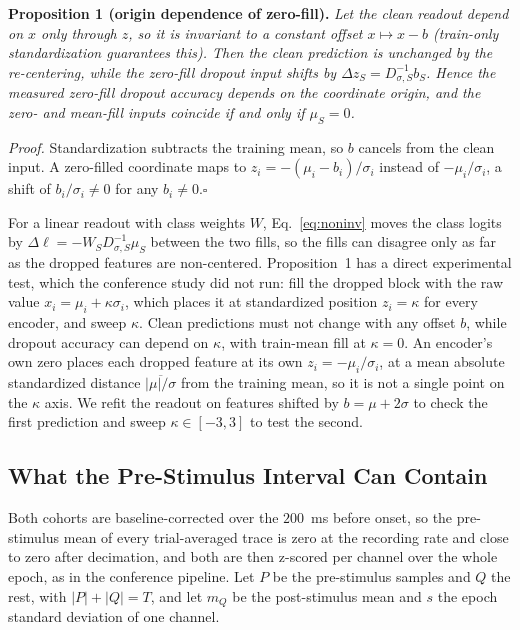 \documentclass[journal]{IEEEtran}
\begin{document}
\noindent\textbf{Proposition 1 (origin dependence of zero-fill).} \emph{Let the clean readout depend on $x$ only through $z$, so it is invariant to a constant offset $x\mapsto x-b$ (train-only standardization guarantees this). Then the clean prediction is unchanged by the re-centering, while the zero-fill dropout input shifts by $\Delta z_S=D_{\sigma,S}^{-1}b_S$. Hence the measured zero-fill dropout accuracy depends on the coordinate origin, and the zero- and mean-fill inputs coincide if and only if $\mu_S=0$.}

\noindent\emph{Proof.} Standardization subtracts the training mean, so $b$ cancels from the clean input. A zero-filled coordinate maps to $z_i=-(\mu_i-b_i)/\sigma_i$ instead of $-\mu_i/\sigma_i$, a shift of $b_i/\sigma_i\neq0$ for any $b_i\neq0$.\hfill$\square$

For a linear readout with class weights $W$, Eq.~\eqref{eq:noninv} moves the class logits by $\Delta\ell=-W_S D_{\sigma,S}^{-1}\mu_S$ between the two fills, so the fills can disagree only as far as the dropped features are non-centered. Proposition~1 has a direct experimental test, which the conference study did not run: fill the dropped block with the raw value $x_i=\mu_i+\kappa\sigma_i$, which places it at standardized position $z_i=\kappa$ for every encoder, and sweep $\kappa$. Clean predictions must not change with any offset $b$, while dropout accuracy can depend on $\kappa$, with train-mean fill at $\kappa=0$. An encoder's own zero places each dropped feature at its own $z_i=-\mu_i/\sigma_i$, at a mean absolute standardized distance $\overline{|\mu|/\sigma}$ from the training mean, so it is not a single point on the $\kappa$ axis. We refit the readout on features shifted by $b=\mu+2\sigma$ to check the first prediction and sweep $\kappa\in[-3,3]$ to test the second.

\subsection{What the Pre-Stimulus Interval Can Contain}
\label{sec:prop2}
Both cohorts are baseline-corrected over the $200$~ms before onset, so the pre-stimulus mean of every trial-averaged trace is zero at the recording rate and close to zero after decimation, and both are then z-scored per channel over the whole epoch, as in the conference pipeline. Let $P$ be the pre-stimulus samples and $Q$ the rest, with $|P|+|Q|=T$, and let $m_Q$ be the post-stimulus mean and $s$ the epoch standard deviation of one channel.
\end{document}
